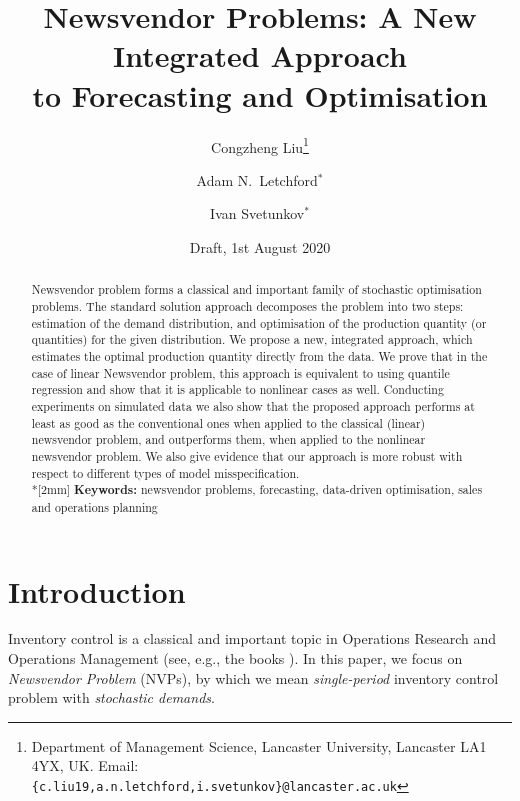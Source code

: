 \documentclass{article}
\title{Newsvendor Problems: A New Integrated Approach\\ to Forecasting and Optimisation}
\author{Congzheng Liu\thanks{Department of Management Science,
Lancaster University, Lancaster LA1 4YX, UK.
Email: {\tt \{c.liu19,a.n.letchford,i.svetunkov\}@lancaster.ac.uk}}
\and Adam N.\ Letchford$^*$ \and Ivan Svetunkov$^*$} %
\date{Draft, 1st August 2020}
\begin{document}
\maketitle

\begin{abstract}
Newsvendor problem forms a classical and important family of stochastic optimisation problems. The standard solution approach decomposes the problem into two steps: estimation of the demand distribution, and optimisation of the production quantity (or quantities) for the given distribution. We propose a new, integrated approach, which estimates the optimal production quantity directly from the data. We prove that in the case of linear Newsvendor problem, this approach is equivalent to using quantile regression and show that it is applicable to nonlinear cases as well. Conducting experiments on simulated data we also show that the proposed approach performs at least as good as the conventional ones when applied to the classical (linear) newsvendor problem, and outperforms them, when applied to the nonlinear newsvendor problem. We also give evidence that our approach is more robust with respect to different types of model misspecification.
\\*[2mm]
{\bf Keywords:} newsvendor problems, forecasting, data-driven optimisation, sales and operations planning
\end{abstract}


\section{Introduction}

Inventory control is a classical and important topic in Operations Research and Operations Management (see, e.g., the books \cite{Po02,SPP98,Zi00}). In this paper, we focus on \emph{Newsvendor Problem} (NVPs), by which we mean \emph{single-period} inventory control problem with \emph{stochastic demands}.
\end{document}
